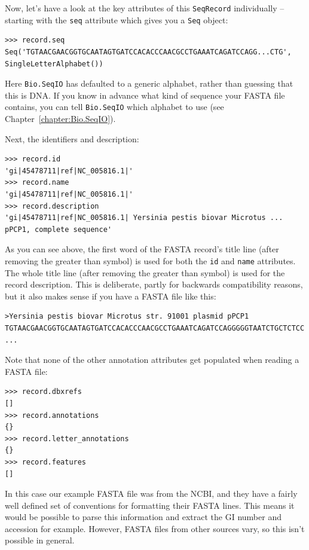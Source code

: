 \documentclass{report}
\begin{document}
Now, let's have a look at the key attributes of this \verb|SeqRecord|
individually -- starting with the \verb|seq| attribute which gives you a
\verb|Seq| object:

\begin{verbatim}
>>> record.seq
Seq('TGTAACGAACGGTGCAATAGTGATCCACACCCAACGCCTGAAATCAGATCCAGG...CTG', SingleLetterAlphabet())
\end{verbatim}

\noindent Here \verb|Bio.SeqIO| has defaulted to a generic alphabet, rather
than guessing that this is DNA. If you know in advance what kind of sequence
your FASTA file contains, you can tell \verb|Bio.SeqIO| which alphabet to use
(see Chapter~\ref{chapter:Bio.SeqIO}).

Next, the identifiers and description:

\begin{verbatim}
>>> record.id
'gi|45478711|ref|NC_005816.1|'
>>> record.name
'gi|45478711|ref|NC_005816.1|'
>>> record.description
'gi|45478711|ref|NC_005816.1| Yersinia pestis biovar Microtus ... pPCP1, complete sequence'
\end{verbatim}

As you can see above, the first word of the FASTA record's title line (after
removing the greater than symbol) is used for both the \verb|id| and
\verb|name| attributes. The whole title line (after removing the greater than
symbol) is used for the record description. This is deliberate, partly for
backwards compatibility reasons, but it also makes sense if you have a FASTA
file like this:

\begin{verbatim}
>Yersinia pestis biovar Microtus str. 91001 plasmid pPCP1
TGTAACGAACGGTGCAATAGTGATCCACACCCAACGCCTGAAATCAGATCCAGGGGGTAATCTGCTCTCC
...
\end{verbatim}

Note that none of the other annotation attributes get populated when reading a
FASTA file:

\begin{verbatim}
>>> record.dbxrefs
[]
>>> record.annotations
{}
>>> record.letter_annotations
{}
>>> record.features
[]
\end{verbatim}

In this case our example FASTA file was from the NCBI, and they have a fairly well defined set of conventions for formatting their FASTA lines. This means it would be possible to parse this information and extract the GI number and accession for example. However, FASTA files from other sources vary, so this isn't possible in general.
\end{document}
